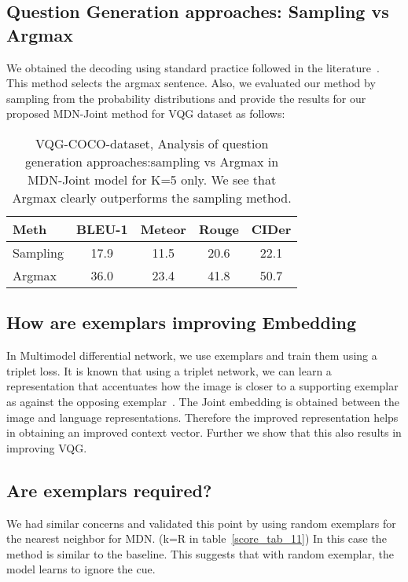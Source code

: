 \documentclass[11pt,a4paper]{article}
\begin{document}
\subsection{Question Generation approaches: Sampling vs Argmax}
 We obtained the decoding using standard practice followed in the literature~\cite{Sutskever_NIPS2014}. This method selects the argmax sentence. Also, we evaluated our method by sampling from the probability distributions and provide the results for our proposed MDN-Joint method for VQG dataset as follows:
 \begin{table}[h!]
\scriptsize
\centering
\begin{tabular}{|l|cccc|}
\hline \bf Meth &\bf BLEU-1 & \bf Meteor & \bf Rouge  & \bf CIDer \\ \hline
Sampling &  17.9 &11.5 & 20.6 & 22.1\\ 
Argmax &  36.0 &23.4 & 41.8 & 50.7\\ \hline
\end{tabular}
\caption{\label{score_tab_12}VQG-COCO-dataset, Analysis of question generation approaches:sampling vs Argmax in MDN-Joint model for K=5 only. We see that Argmax clearly outperforms the sampling method.}
\end{table}

\subsection{How are exemplars improving Embedding}
In Multimodel differential network, we use exemplars and train them using a triplet loss. It is known that using a triplet network, we can learn a representation that accentuates how the image is closer to a supporting exemplar as against the opposing exemplar~\cite{Hoffer_Springer2015,Frome_ICCV2007}. The Joint embedding is obtained between the image and language representations. Therefore the improved representation helps in obtaining an improved context vector. Further we show that this also results in improving VQG. 

\subsection{Are exemplars required?}
We had similar concerns and validated this point by using random exemplars for the nearest neighbor for MDN. (k=R in table~\ref{score_tab_11}) In this case the method is similar to the baseline. This suggests that with random exemplar, the model learns to ignore the cue. 
\end{document}
